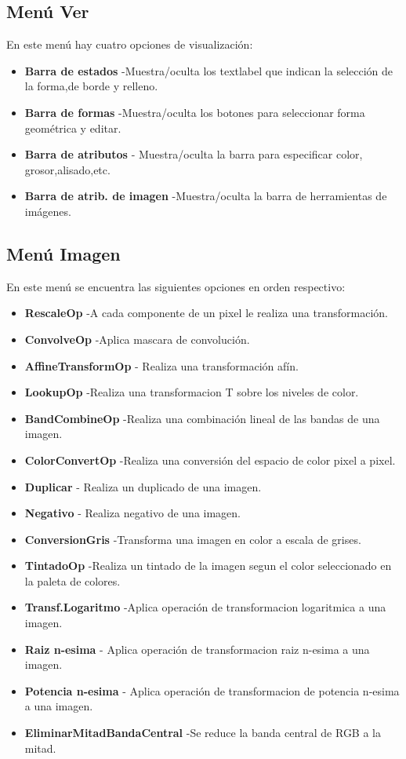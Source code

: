 \subsection{Menú Ver}
En este menú hay cuatro opciones de visualización:
\begin{itemize}
\item \textbf{Barra de estados} -Muestra/oculta los textlabel que indican la selección de la forma,de borde y relleno.
\item \textbf{Barra de formas} -Muestra/oculta los botones para seleccionar forma geométrica y editar.
\item \textbf{Barra de atributos} - Muestra/oculta la barra para especificar color, grosor,alisado,etc.
\item \textbf{Barra de atrib. de imagen} -Muestra/oculta la barra de herramientas de imágenes.
\end{itemize}

\subsection{Menú Imagen}
En este menú se encuentra las siguientes opciones en orden respectivo:
\begin{itemize}
\item \textbf{RescaleOp} -A cada componente de un pixel le realiza una transformación.
\item \textbf{ConvolveOp} -Aplica mascara de convolución.
\item \textbf{AffineTransformOp} - Realiza una transformación afín.
\item \textbf{LookupOp} -Realiza una transformacion T sobre los niveles de color.
\item \textbf{BandCombineOp} -Realiza una combinación lineal de las bandas de una imagen. 
\item \textbf{ColorConvertOp} -Realiza una conversión del espacio de color pixel a pixel.
\item \textbf{Duplicar} - Realiza un duplicado de una imagen.
\item \textbf{Negativo} - Realiza negativo de una imagen. 
\item \textbf{ConversionGris} -Transforma una imagen en color a escala de grises.
\item \textbf{TintadoOp} -Realiza un tintado de la imagen segun el color seleccionado en la paleta de colores.
\item \textbf{Transf.Logaritmo} -Aplica operación de transformacion logaritmica a una imagen.
\item \textbf{Raiz n-esima} - Aplica operación de transformacion raiz n-esima a una imagen.
\item \textbf{Potencia n-esima} - Aplica operación de transformacion de potencia n-esima a una imagen. 
\item \textbf{EliminarMitadBandaCentral} -Se reduce la banda central de RGB a la mitad.
\end{itemize}


